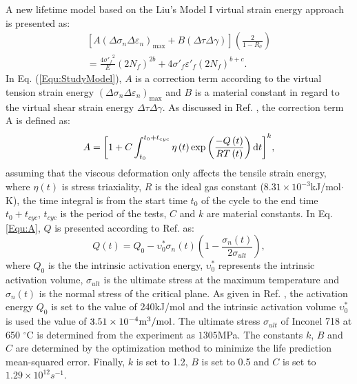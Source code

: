 \documentclass[preprint,5p,twocolumn,11pt,sort&compress]{elsarticle}
\begin{document}
A new lifetime model based on the Liu's Model I virtual strain energy approach is presented as:
\begin{equation}
\begin{aligned}
\left[ {A{{\left( {\Delta {\sigma _n}\Delta {\varepsilon _n}} \right)}_{\max }} + B\left( {\Delta \tau \Delta \gamma } \right)} \right]\left( {\frac{2}{{1 - {R_\sigma }}}} \right)\\
= \frac{{4{{\sigma '}_f}^2}}{E}{\left( {2{N_f}} \right)^{2b}} + 4{{\sigma '}_f}{{\varepsilon '}_f}{\left( {2{N_f}} \right)^{b + c}}.
\end{aligned}
\label{Equ:StudyModel}
\end{equation}
In Eq. (\ref{Equ:StudyModel}), $A$ is a correction term according to the virtual tension strain energy ${{\left( {\Delta {\sigma _n}\Delta {\varepsilon _n}} \right)}_{\max }}$ and $B$ is a material constant in regard to the virtual shear strain energy ${\Delta \tau \Delta \gamma }$.
As discussed in Ref. \cite{Vose2013}, the correction term A is defined as:
\begin{equation}
A = {\left[ {1 + C\int_{{t_0}}^{{t_0} + {t_{cyc}}} {\eta \left( t \right)\exp \left( {\frac{{ - Q\left( t \right)}}{{RT\left( t \right)}}} \right){\rm{d}}t} } \right]^k},
\label{Equ:A}
\end{equation}
assuming that the viscous deformation only affects the tensile strain energy, where $\eta \left( t \right)$ is stress triaxiality, $R$ is the ideal gas constant ($8.31\times10^{-3}$kJ/mol$\cdot$K), the time integral is from the start time $t_0$ of the cycle to the end time $t_0 + t_{cyc}$, $t_{cyc}$ is the period of the tests, $C$ and $k$ are material constants.
In Eq. \ref{Equ:A}, $Q$ is presented according to Ref. \cite{Warren2006,Warren2008} as:
\begin{equation}
Q\left( t \right) = {Q_0} - \upsilon _0^*{\sigma _n}\left( t \right)\left( {1 - \frac{{{\sigma _n}\left( t \right)}}{{2{\sigma _{ult}}}}} \right),
\label{Equ:creep_activation_energy}
\end{equation}
where $Q_0$ is the the intrinsic activation energy, $\upsilon _0^*$ represents the intrinsic activation volume, $\sigma_{ult}$ is the ultimate stress at the maximum temperature and $\sigma_n(t)$ is the normal stress of the critical plane.
As given in Ref. \cite{Warren2008}, the activation energy $Q_0$ is set to the value of 240kJ/mol and the intrinsic activation volume $\upsilon _0^*$ is used the value of $3.51\times10^{-4}\rm{m}^{3}/\rm{mol}$. The ultimate stress $\sigma_{ult}$ of Inconel 718 at 650 $^\circ$C is determined from the experiment as $1305$MPa. The constants $k$, $B$ and $C$ are determined by the optimization method to minimize the life prediction mean-squared error. Finally, $k$ is set to 1.2, $B$ is set to 0.5 and $C$ is set to $1.29\times10^{12}s^{-1}$.
\end{document}
